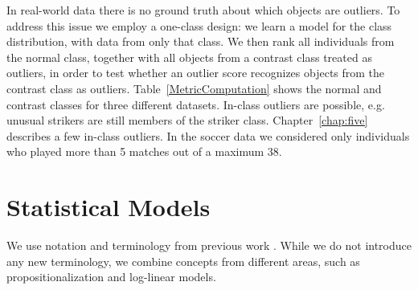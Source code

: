  	In real-world data there is no ground truth about which objects are outliers. To address this issue we employ a one-class design: we learn a model for the class distribution, with data from only that class. We then rank all individuals from the normal class, together with all objects from a contrast class treated as outliers, in order to test whether an outlier score recognizes objects from the contrast class as outliers.
 	Table~\ref{MetricComputation} shows the normal and contrast classes for three different datasets.  In-class outliers are possible, e.g. unusual strikers are still members of the striker class. Chapter~\ref{chap:five} describes a few in-class outliers. In the soccer data we considered only individuals who played more than 5 matches out of a maximum 38. 
 	
 	\begin{table}
 		\caption{Outlier/normal objects in real-world datasets. }
 		\label{MetricComputation}
 		\centering
 			
 		\end{table}
 		
 	\section{Statistical Models} \label{sec:otherStat}
 	
 	We use notation and terminology from previous work \cite{Poole2003,Chiang2012,Lippi2011,Domingos2009}. While we do not introduce any new terminology, we combine concepts from different areas, such as propositionalization and log-linear models. 
 	
